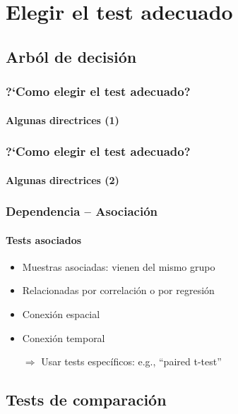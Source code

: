 \documentclass[gray,handout,mathserif]{beamer}
\begin{document}
\section[?`Cu\'al test?]{Elegir el test adecuado}

\subsection[Arb\'ol de decisi\'on]{Arb\'ol de decisi\'on}

\begin{frame}[label=chtest1]
   \frametitle{?`Como elegir el test adecuado?}
   \framesubtitle{Algunas directrices (1)}
   \scriptsize
   
\end{frame}%


\begin{frame}[label=chtest2]
   \frametitle{?`Como elegir el test adecuado?}
   \framesubtitle{Algunas directrices (2)}
   \scriptsize
   
   \normalsize
\end{frame}%


\begin{frame}[label=deppair]
   \frametitle{Dependencia -- Asociaci\'on}
   \framesubtitle{Tests asociados}
   \begin{itemize}
      \item Muestras asociadas: vienen del mismo grupo
      \item Relacionadas por correlaci\'on o por regresi\'on
      \item Conexi\'on espacial
      \item Conexi\'on temporal
      \vspace{1ex}
      \item[$\Rightarrow$] Usar tests espec\'ificos: e.g., ``paired t-test''
   \end{itemize}
\end{frame}%


\subsection[Comparaci\'on]{Tests de comparaci\'on}
\end{document}
